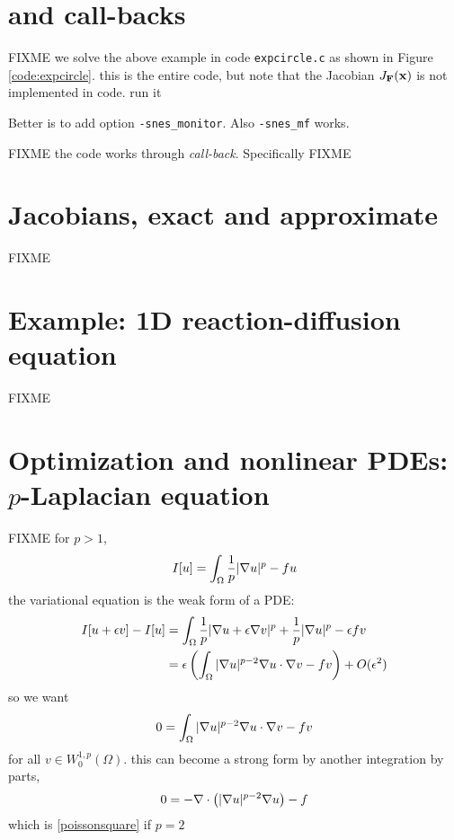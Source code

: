 \section{\pSNES and call-backs}

FIXME  we solve the above example in code \texttt{expcircle.c} as shown in Figure \ref{code:expcircle}.  this is the entire code, but note that the Jacobian $J_{\mathbf{F}}(\mathbf{x})$ is not implemented in code.  run it
Better is to add option \texttt{-snes\_monitor}.  Also \texttt{-snes\_mf} works.

FIXME the code works through \emph{call-back}.  Specifically FIXME

\vfill
{}


\section{Jacobians, exact and approximate}

FIXME

\vfill
{}



\section{Example: 1D reaction-diffusion equation}

FIXME

\vfill
{}




\section{Optimization and nonlinear PDEs: $p$-Laplacian equation}

FIXME for $p>1$,
    $$I[u] = \int_\Omega \frac{1}{p} |\nabla u|^p - fu$$
the variational equation is the weak form of a PDE:
\begin{align*}
I[u+\epsilon v] - I[u] &= \int_\Omega \frac{1}{p} |\nabla u + \epsilon \nabla v|^p + \frac{1}{p} |\nabla u|^p - \epsilon f v \\
   &= \epsilon \left(\int_\Omega |\nabla u|^{p-2} \nabla u \cdot \nabla v - f v\right) + O(\epsilon^2)
\end{align*}
so we want
    $$0 = \int_\Omega |\nabla u|^{p-2} \nabla u \cdot \nabla v - f v$$
for all $v \in W^{1,p}_0(\Omega)$.  this can become a strong form by another integration by parts,
    $$0 = - \nabla\cdot\left(|\nabla u|^{p-2} \nabla u\right) - f$$
which is \eqref{poissonsquare} if $p=2$

